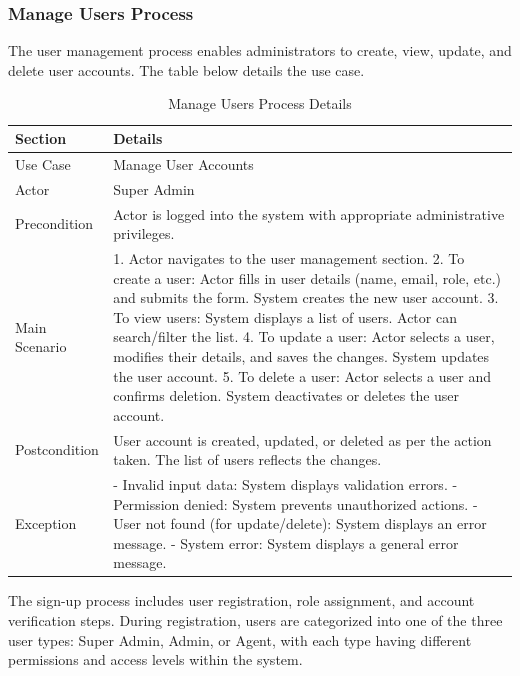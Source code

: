 \newpage
\subsubsection{Manage Users Process}
The user management process enables administrators to create, view, update, and delete user accounts. The table below details the use case.

\begin{table}[htbp]
    \centering
    \begin{tabular}{|l|p{}|}
        \hline
        \textbf{Section} & \textbf{Details} \\
        \hline
        Use Case & Manage User Accounts \\
        \hline
        Actor & Super Admin \\
        \hline
        Precondition & Actor is logged into the system with appropriate administrative privileges. \\
        \hline
        Main Scenario & 
        1. Actor navigates to the user management section.
        2. To create a user: Actor fills in user details (name, email, role, etc.) and submits the form. System creates the new user account.
        3. To view users: System displays a list of users. Actor can search/filter the list.
        4. To update a user: Actor selects a user, modifies their details, and saves the changes. System updates the user account.
        5. To delete a user: Actor selects a user and confirms deletion. System deactivates or deletes the user account. \\
        \hline
        Postcondition & User account is created, updated, or deleted as per the action taken. The list of users reflects the changes. \\
        \hline
        Exception & 
        - Invalid input data: System displays validation errors.
        - Permission denied: System prevents unauthorized actions.
        - User not found (for update/delete): System displays an error message.
        - System error: System displays a general error message. \\
        \hline
    \end{tabular}
    \caption{Manage Users Process Details}
    \label{tab:manage_users_process}
\end{table}


The sign-up process includes user registration, role assignment, and account verification steps. During registration, users are categorized into one of the three user types: Super Admin, Admin, or Agent, with each type having different permissions and access levels within the system.

